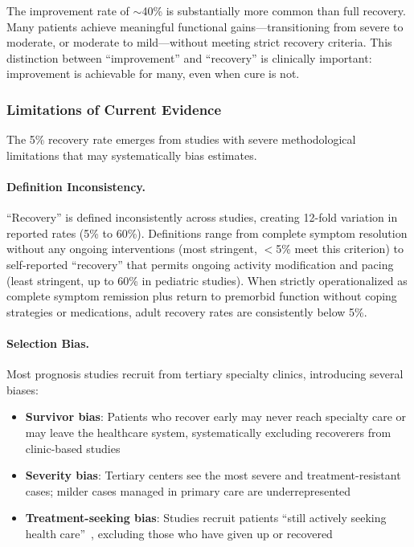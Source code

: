 The improvement rate of $\sim$40\% is substantially more common than full recovery. Many patients achieve meaningful functional gains---transitioning from severe to moderate, or moderate to mild---without meeting strict recovery criteria. This distinction between ``improvement'' and ``recovery'' is clinically important: improvement is achievable for many, even when cure is not.

\subsubsection{Limitations of Current Evidence}

The 5\% recovery rate emerges from studies with severe methodological limitations that may systematically bias estimates.

\paragraph{Definition Inconsistency.}
``Recovery'' is defined inconsistently across studies, creating 12-fold variation in reported rates (5\% to 60\%). Definitions range from complete symptom resolution without any ongoing interventions (most stringent, $<$5\% meet this criterion) to self-reported ``recovery'' that permits ongoing activity modification and pacing (least stringent, up to 60\% in pediatric studies). When strictly operationalized as complete symptom remission plus return to premorbid function without coping strategies or medications, adult recovery rates are consistently below 5\%.

\paragraph{Selection Bias.}
Most prognosis studies recruit from tertiary specialty clinics, introducing several biases:
\begin{itemize}
    \item \textbf{Survivor bias}: Patients who recover early may never reach specialty care or may leave the healthcare system, systematically excluding recoverers from clinic-based studies
    \item \textbf{Severity bias}: Tertiary centers see the most severe and treatment-resistant cases; milder cases managed in primary care are underrepresented
    \item \textbf{Treatment-seeking bias}: Studies recruit patients ``still actively seeking health care''~\cite{Lacourt2022prognosis}, excluding those who have given up or recovered
\end{itemize}

